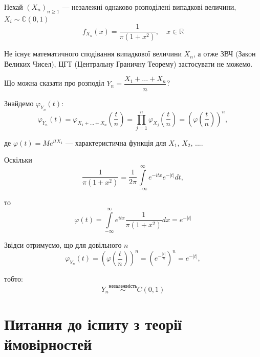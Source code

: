 \begin{example}
    Нехай $(X_n)_{n \geqslant 1}$ --- незалежні однаково розподілені
    випадкові величини, $X_i \sim \mathbb{C}(0, 1)$
    $$f_{X_n}(x) = \dfrac{1}{\pi (1 + x^2)}, \quad x \in \mathbb{R}$$
    
    Не існує математичного сподівання випадкової величини $X_n$,
    а отже ЗВЧ (Закон Великих Чисел), ЦГТ (Центральну Граничну Теорему)
    застосувати не можемо.
    
    Що можна сказати про розподіл $Y_n = \dfrac{X_1 + ... + X_n}{n}$?
    
    Знайдемо $\varphi_{Y_n}(t)$:
    $$\varphi_{Y_n}(t)
    = \varphi_{X_1 + ... + X_n}(\frac{t}{n})
    = \prod\limits_{j=1}^{n} \varphi_{X_j}(\frac{t}{n})
    = (\varphi(\frac{t}{n}))^n,$$
    
    де $\varphi(t) = Me^{itX_1}$ --- характеристична функція
    для $X_1$, $X_2$, ....
    
    Оскільки  
    $$\dfrac{1}{\pi (1+x^2)}
    = \dfrac{1}{2 \pi} \int\limits_{-\infty}^{\infty} e^{-itx} e^{-|t|} dt,$$
    
    то
    $$\varphi(t)
    = \int\limits_{-\infty}^{\infty} e^{itx} \dfrac{1}{\pi (1 + x^2)} dx
    = e^{-|t|}$$
    
    Звідси отримуємо, що для довільного $n$
    $$\varphi_{Y_n}(t)
    = (\varphi(\frac{t}{n}))^n
    = (e^{-\frac{|t|}{n}})^n
    = e^{-|t|},$$
    
    тобто:
    $$Y_n \stackrel{\text{незалежність}}{\sim} C(0, 1)$$
\end{example}

\section{Питання до іспиту з теорії ймовірностей}

